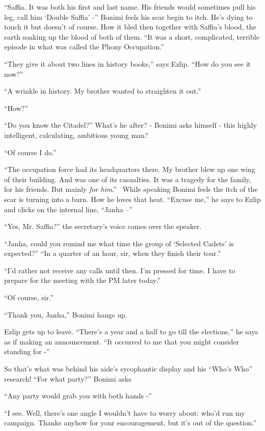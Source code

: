 \documentclass[twoside,11pt]{book}
\begin{document}
``Saffia. It was both his first and last name. His friends would sometimes pull his leg,
%
 call him `Double Saffia' -'' Bonimi feels his scar begin to itch. He's dying to touch it but doesn't of
course. How it bled then together with Saffia's blood, the earth soaking up the blood of both of them.
``It was a short, complicated, terrible episode in what was called the Phony Occupation.''

``They give it about two lines in history books,'' says Ezlip. ``How do you see
it now?''

``A wrinkle in history. My brother wanted to straighten it out.''

``How?''

``Do you know the Citadel?'' What's he after? - Bonimi asks himself - this highly intelligent,
calculating, ambitious young man?

``Of course I do.''

``The occupation force had its headquarters there. My brother blew up one wing of their building. And was
one of its casualties. It was a tragedy for the family, for his friends. But mainly \textit{for him}.''
\ While speaking Bonimi feels the itch of the scar is turning into a burn. How he loves that heat.
``Excuse me,'' he says to Ezlip and clicks on the internal line,
``Janha --''

``Yes, Mr. Saffia?'' the secretary's voice comes over the speaker.

``Janha, could you remind me what time the group of `Selected Cadets' is
expected?'' ``In a quarter of an hour, sir, when they finish their tour.''

``I'd rather not receive any calls until then. I'm pressed for time. I have to prepare for the meeting with
the PM later today.''

``Of course, sir.''

``Thank you, Janha,'' Bonimi hangs up.

Ezlip gets up to leave. ``There's a year and a half to go till the elections,'' he says as if
making an announcement. ``It occurred to me that you might consider standing for -''

So that's what was behind his aide's sycophantic display and his ``Who's
Who'' research! ``For what party?'' Bonimi asks

``Any party would grab you with both hands -''

``I see. Well, there's one angle I wouldn't have to worry about: who'd run my campaign.
Thanks anyhow for your encouragement, but it's out of the question.''
\end{document}
